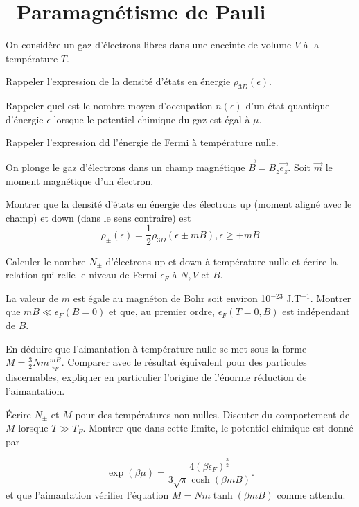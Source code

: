 \documentclass[utf8, 11pt]{feuille}
\begin{document}




\section{\medium~Paramagnétisme de Pauli}

On considère un gaz d'électrons libres dans une enceinte de volume $V$ à la température $T$.

\question
Rappeler l'expression de la densité d'états en énergie $\rho_{3D}(\epsilon)$.

\question
Rappeler quel est le nombre moyen d'occupation $n(\epsilon)$ d'un état quantique d'énergie $\epsilon$ lorsque le potentiel chimique du gaz est égal à $\mu$.

\question
Rappeler l'expression dd l'énergie de Fermi à température nulle.

\medskip

On plonge le gaz d'électrons dans un champ magnétique $\vec{B}=B_z\vec{e_z}$. Soit $\vec{m}$ le moment magnétique d'un électron.

\question
Montrer que la densité d'états en énergie des électrons up (moment aligné avec le champ) et down (dans le sens contraire) est
$$
\rho_\pm(\epsilon)=\frac{1}{2}\rho_{3D}(\epsilon \pm mB), \epsilon \geq \mp mB
$$

\question
Calculer le nombre $N_\pm$ d'électrons up et down à température nulle et écrire la relation qui relie le niveau de Fermi $\epsilon_F$ à $N, V$ et $B$.

\question
La valeur de $m$ est égale au  magnéton de Bohr soit environ 10$^{-23}$ J.T$^{-1}$. Montrer que $mB \ll \epsilon_F(B=0)$ et que, au premier ordre, $\epsilon_F(T=0,B)$ est indépendant de $B$.

\question
En déduire que l'aimantation à température nulle se met sous la forme $M=\frac{3}{2} N m \frac{mB}{\epsilon_F}$. Comparer avec le résultat équivalent pour des particules discernables, expliquer en particulier l'origine de l'énorme réduction de l'aimantation.

\question
\'Ecrire $N_\pm$ et $M$ pour des températures non nulles. Discuter du comportement de $M$ lorsque $T\gg T_F$. Montrer que dans cette limite, le potentiel chimique est donné par

$$
\exp (\beta \mu)=\frac{4(\beta \epsilon_F)^{\frac{3}{2}}}{3\sqrt{\pi}\cosh(\beta m B)}. \nonumber
$$
et que l'aimantation vérifier l'équation $M= Nm\tanh(\beta m B)$ comme attendu.
\end{document}

